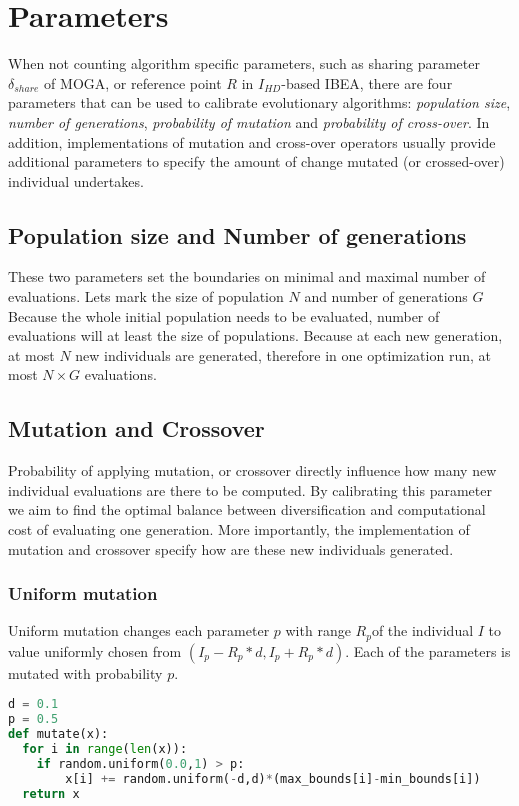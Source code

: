 \documentclass[12pt,oneside]{fithesis2}
\begin{document}
\section{Parameters}

When not counting algorithm specific parameters, such as sharing parameter $\delta_{share}$ of MOGA, or reference point $R$ in $I_{HD}$-based IBEA, there are four parameters that can be used to calibrate evolutionary algorithms: \emph{population size}, \emph{number of generations}, \emph{probability of mutation} and \emph{probability of cross-over}. In addition, implementations of mutation and cross-over operators usually provide additional parameters to specify the amount of change mutated (or crossed-over) individual undertakes.

\subsection{Population size and Number of generations}
These two parameters set the boundaries on minimal and maximal number of evaluations. Lets mark the size of population $N$ and number of generations $G$ Because the whole initial population needs to be evaluated, number of evaluations will at least the size of populations.
Because at each new generation, at most $N$ new individuals are generated, therefore in one optimization run, at most $N \times G$ evaluations.

\subsection{Mutation and Crossover}
Probability of applying mutation, or crossover directly influence how many new individual evaluations are there to be computed. By calibrating this parameter we aim to find the optimal balance between diversification and computational cost of evaluating one generation. More importantly, the implementation of mutation and crossover specify how are these new individuals generated. 

\subsubsection{Uniform mutation} 
Uniform mutation changes each parameter $p$ with range $R_p$of the individual $I$ to value uniformly chosen from $(I_p - R_p*d,I_p + R_p*d)$. Each of the parameters is mutated with probability $p$.
\begin{lstlisting}[language=Python,label=mutate_example,caption=Uniform mutation example]
d = 0.1
p = 0.5
def mutate(x):
  for i in range(len(x)):
    if random.uniform(0.0,1) > p:
        x[i] += random.uniform(-d,d)*(max_bounds[i]-min_bounds[i])
  return x
\end{lstlisting}
\end{document}
